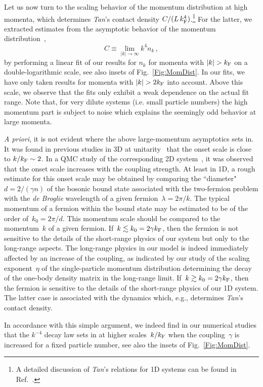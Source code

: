 \documentclass[pra,aps,groupedaddress,floatfix,twocolumn,superscriptaddress,showpacs,nofootinbib]{revtex4-1}
\newcommand{\beq}{\begin{equation}}
\newcommand{\eeq}{\end{equation}}
\newcommand{\kf}{k_\textnormal{F}}
\begin{document}
{Let us now turn to the scaling behavior of the momentum distribution
at high momenta, which determines {\it Tan}'s contact density $C /(L\,\kf^{4})$.\footnote{A detailed
discussion of {\it Tan}'s relations for 1D systems can be found
in Ref.~\cite{2011AnPhy.326.2544B}.}
For the latter, we extracted
estimates from the asymptotic behavior of
the momentum distribution~\cite{Tan20082952,*Tan20082971,*Tan20082987},
%
\beq
C \equiv \lim_{|k|\to\infty}k^4 n_k\,,
\eeq
%
by performing a linear fit of our results for $n_{k}^{}$ for momenta with $|k| > \kf$
on a double-logarithmic scale, see also insets of Fig.~\ref{Fig:MomDist}.
{In our fits, we have only taken
results for momenta with $|k| > 2\kf$ into account. Above this scale, we observe that the fits only exhibit a
weak dependence on the actual fit range. { Note that, for very dilute systems (i.e. small particle numbers) the high momentum part is subject to noise which explains the seemingly odd behavior at large momenta.}}

{\it A priori}, it is not evident where the above large-momentum asymptotics sets in.
It was found in previous studies in 3D at unitarity~\cite{momDecayCutoff} that
the onset scale is close to $k/\kf \sim 2$. In a QMC study of the corresponding 2D system~\cite{GCS2D},
it was observed that the onset scale increases with the coupling strength.
At least in 1D, a rough estimate for this onset scale
may be obtained by comparing the ``diameter"~$d=2/(\gamma n)$ of the bosonic
bound state associated with the two-fermion problem with the
{\it de Broglie} wavelength of a given fermion~$\lambda=2\pi/k$.
The typical momentum of a fermion within the bound state may be estimated to be of
the order of~$k_0=2\pi/d$. This momentum scale should be
compared to the momentum~$k$ of a given fermion.
If~$k\lesssim k_0=2\gamma\kf$, then the fermion is not sensitive to the
details of the
short-range physics of our system but only to the long-range aspects.
The long-range physics in our model is indeed
immediately affected by an increase of the coupling,
as indicated by our study of the scaling exponent~$\eta$ of the single-particle
momentum distribution determining the decay
of the one-body density matrix in the long-range limit.
If~$k \gtrsim k_0=2\gamma\kf$, then the fermion is sensitive to the details of the
short-range physics of our 1D system. The latter case is associated with the dynamics which, e.g.,
determines {\it Tan}'s contact density.

In accordance with this simple argument,
we indeed find in our numerical studies that the $k^{-4}$ decay law sets in at higher scales~$k/\kf$ when
the coupling~$\gamma$ is increased for a fixed particle number, see also the insets of Fig.~\ref{Fig:MomDist}.}
\end{document}
